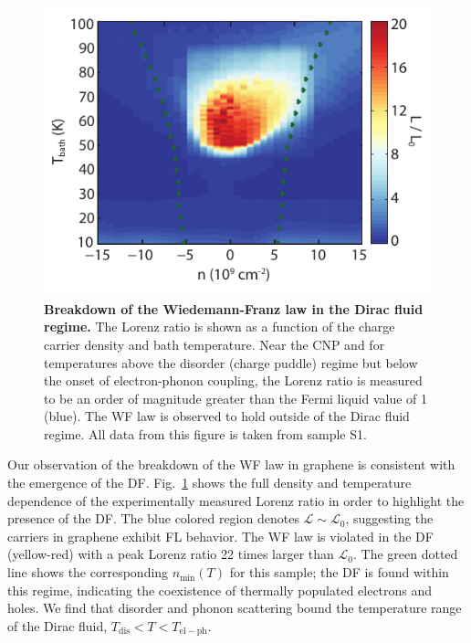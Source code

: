 \begin{figure}
\includegraphics[width=\columnwidth]{figures/Dirac_fluid/Fig2.pdf}
\caption{\textbf{Breakdown of the Wiedemann-Franz law in the Dirac fluid regime.} The Lorenz ratio is shown as a function of the charge carrier density and bath temperature. Near the CNP and for temperatures above the disorder (charge puddle) regime but below the onset of electron-phonon coupling, the Lorenz ratio is measured to be an order of magnitude greater than the Fermi liquid value of 1 (blue). The WF law is observed to hold outside of the Dirac fluid regime.  All data from this figure is taken from sample S1.}
\label{fig:DF_Fig2}
\end{figure}

Our observation of the breakdown of the WF law in graphene is consistent with the emergence of the DF. Fig.~\ref{fig:DF_Fig2} shows the full density and temperature dependence of the experimentally measured Lorenz ratio in order to highlight the presence of the DF. The blue colored region denotes $\mathcal{L}\sim\mathcal{L}_0$, suggesting the carriers in graphene exhibit FL behavior. The WF law is violated in the DF (yellow-red) with a peak Lorenz ratio 22 times larger than $\mathcal{L}_0$. The green dotted line shows the corresponding $n_{\mathrm{min}}(T)$ for this sample; the DF is found within this regime, indicating the coexistence of thermally populated electrons and holes. We find that disorder and phonon scattering bound the temperature range of the Dirac fluid, $T_{\mathrm{dis}}<T<T_{\mathrm{el-ph}}$.

